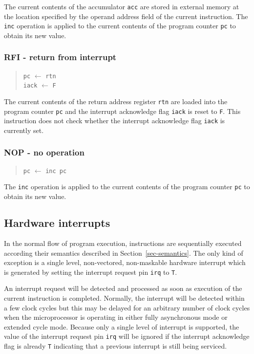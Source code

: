 The current contents of the accumulator \verb"acc" are stored in
external memory at the location specified by the operand
address field of the current instruction.
The \verb"inc" operation
is applied to the current contents of the program counter \verb"pc" to
obtain its new value.

\subsubsection*{RFI - return from interrupt}

\begin{quote}
\verb"pc" $\leftarrow$ \verb"rtn"\\
\verb"iack" $\leftarrow$ \verb"F"
\end{quote}

The current contents of the return address register \verb"rtn"
are loaded into the program counter \verb"pc" and the interrupt acknowledge
flag \verb"iack" is reset to \verb"F".
This instruction does not check whether the interrupt acknowledge
flag \verb"iack" is currently set.

\subsubsection*{NOP - no operation}

\begin{quote}
\verb"pc" $\leftarrow$ \verb"inc pc"
\end{quote}

The \verb"inc" operation
is applied to the current contents of the program counter \verb"pc" to
obtain its new value.

\subsection{Hardware interrupts}
\label{sec-ireq}

In the normal flow of program execution, instructions are
sequentially executed according their semantics described
in Section~\ref{sec-semantics}.
The only kind of exception is a 
single level, non-vectored, non-maskable hardware interrupt
which is generated by setting the interrupt request pin \verb"irq"
to \verb"T".

An interrupt request will be detected and processed as soon as execution
of the current instruction is completed.
Normally, the interrupt will be detected within a few clock cycles
but this may be delayed for an arbitrary number of
clock cycles when the microprocessor is
operating in either fully asynchronous mode or extended cycle mode.
Because only a single level of interrupt is supported,
the value of the interrupt request pin \verb"irq" will be ignored
if the interrupt acknowledge flag is already \verb"T" indicating
that a previous interrupt is still being serviced.

